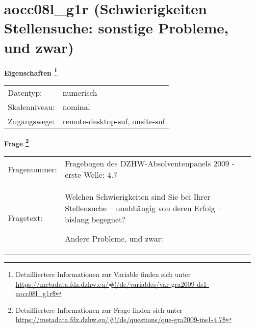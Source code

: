 
    \setcounter{footnote}{0}

    \vspace*{-1.8cm}
	\section{aocc08l\_g1r (Schwierigkeiten Stellensuche: sonstige Probleme, und zwar)}
	\label{section:aocc08l_g1r}



    \vspace*{0.5cm}
    \noindent\textbf{Eigenschaften
	\footnote{Detailliertere Informationen zur Variable finden sich unter
		\url{https://metadata.fdz.dzhw.eu/\#!/de/variables/var-gra2009-ds1-aocc08l_g1r$}}}\\
	\begin{tabularx}{\hsize}{@{}lX}
	Datentyp: & numerisch \\
	Skalenniveau: & nominal \\
	Zugangswege: &
	  remote-desktop-suf, 
	  onsite-suf
 \\
    \end{tabularx}



				\vspace*{0.5cm}
                \noindent\textbf{Frage
	                \footnote{Detailliertere Informationen zur Frage finden sich unter
		              \url{https://metadata.fdz.dzhw.eu/\#!/de/questions/que-gra2009-ins1-4.7$}}}\\
				\begin{tabularx}{\hsize}{@{}lX}
					Fragenummer: &
					  Fragebogen des DZHW-Absolventenpanels 2009 - erste Welle:
					  4.7
 \\
					Fragetext: & Welchen Schwierigkeiten sind Sie bei Ihrer Stellensuche – unabhängig von deren Erfolg – bislang begegnet?\par  Andere Probleme, und zwar: \\
				\end{tabularx}





